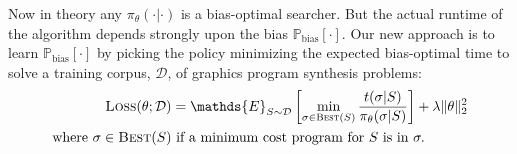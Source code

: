 \documentclass{article}
\newcommand{\expect}{\mathds{E}} %
\newcommand{\probability}{\mathds{P}} %
\theoremstyle{definition}
\begin{document}
    



Now in theory any $\pi_\theta(\cdot |\cdot ) $ is a bias-optimal searcher.
But the actual runtime of the algorithm depends strongly upon
the bias $\probability_{\text{bias}}[\cdot ]$.
Our new approach is to learn $\probability_{\text{bias}}[\cdot ]$
by picking the policy minimizing the
expected bias-optimal time to solve a training corpus, $\mathcal{D}$, of graphics program synthesis problems:
\begin{align}
\textsc{Loss}(\theta ; \mathcal{D})& =  \expect_{S\sim\mathcal{D}}\left[ \min_{\sigma\in \text{\textsc{Best}}(S)}\frac{t(\sigma | S)}{\pi_\theta (\sigma | S)}\right] + \lambda \Vert\theta\Vert_2^2\label{policyLoss}\\
\text{where }  \sigma \in\text{\textsc{Best}}(S) &\text{ if  a minimum cost program for }S \text{ is in }\sigma .\nonumber %
\end{align}
\end{document}
